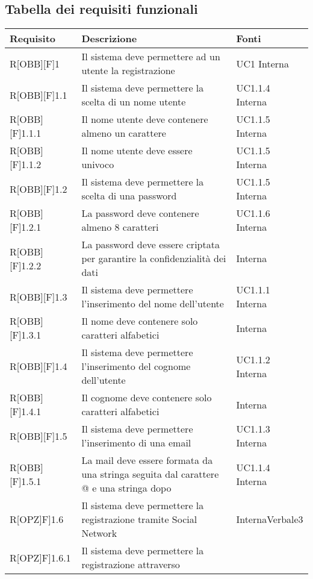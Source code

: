 \subsection{Tabella dei requisiti funzionali}
\begin{table}[h]
	\begin{tabular}{|p{}|p{}|p{}|}
		\toprule
		\textbf{Requisito} & \textbf{Descrizione} & \textbf{Fonti} \\ 
		\midrule 
		R[OBB][F]1 & Il sistema deve permettere ad un utente la
		registrazione & UC1 Interna\\ \midrule 
		R[OBB][F]1.1 & Il sistema deve permettere la scelta di un nome
		utente & UC1.1.4 Interna\\ \midrule 
		R[OBB][F]1.1.1 & Il nome utente deve contenere almeno un carattere & UC1.1.5 Interna\\ \midrule 
		R[OBB][F]1.1.2 & Il nome utente deve essere univoco & UC1.1.5 Interna\\ \midrule 
		R[OBB][F]1.2 & Il sistema deve permettere la scelta di una password & UC1.1.5 Interna\\ \midrule 
		R[OBB][F]1.2.1 & La password deve contenere almeno 8 caratteri & UC1.1.6 Interna\\ \midrule 
		R[OBB][F]1.2.2 & La password deve essere criptata per garantire la
		confidenzialità dei dati & Interna\\ \midrule 
		R[OBB][F]1.3 & Il sistema deve permettere l'inserimento del nome dell'utente & UC1.1.1 Interna\\ \midrule 
		R[OBB][F]1.3.1 & Il nome deve contenere solo caratteri alfabetici & Interna\\ \midrule 
		R[OBB][F]1.4 & Il sistema deve permettere l'inserimento del cognome dell'utente & UC1.1.2 Interna\\ \midrule 
		R[OBB][F]1.4.1 & Il cognome deve contenere solo caratteri alfabetici & Interna\\ \midrule 
		R[OBB][F]1.5 & Il sistema deve permettere l'inserimento di una email & UC1.1.3 Interna\\ \midrule 
		R[OBB][F]1.5.1 & La mail deve essere formata da una stringa seguita
		dal carattere @ e una stringa dopo & UC1.1.4 Interna\\ \midrule 
		R[OPZ]F]1.6 & Il sistema deve permettere la registrazione tramite Social Network & Interna\newline Verbale3\\ \midrule 
		R[OPZ]F]1.6.1 & Il sistema deve permettere la registrazione attraverso

\end{tabular}
\end{table}
